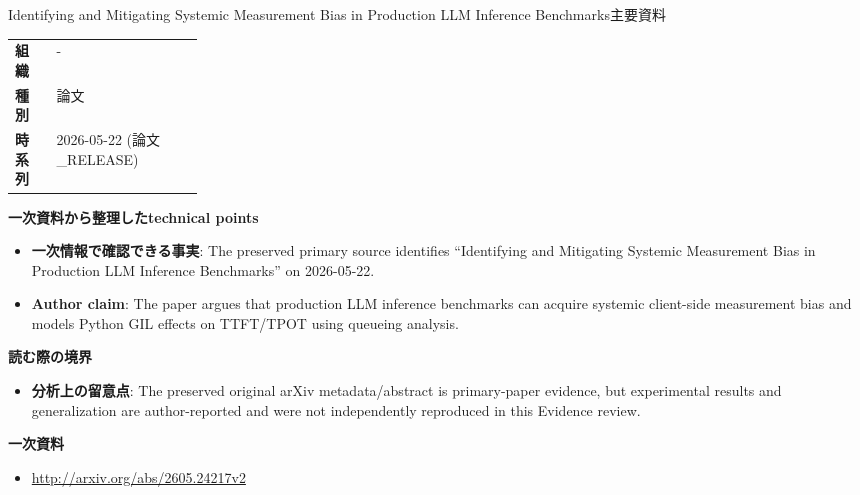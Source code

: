 \begin{technicalnote}{Identifying and Mitigating Systemic Measurement Bias in Production LLM Inference Benchmarks}{主要資料}
\begin{tabularx}{\linewidth}{@{}>{\bfseries}p{0.22\linewidth}X@{}}
組織 & - \\
種別 & 論文 \\
時系列 & 2026-05-22 (論文\_RELEASE) \\
\end{tabularx}
\smallskip
{\bfseries 一次資料から整理したtechnical points}
\begin{itemize}[leftmargin=1.5em,itemsep=0.35em]
\item \textbf{一次情報で確認できる事実}: The preserved primary source identifies “Identifying and Mitigating Systemic Measurement Bias in Production LLM Inference Benchmarks” on 2026-05-22.
\item \textbf{Author claim}: The paper argues that production LLM inference benchmarks can acquire systemic client-side measurement bias and models Python GIL effects on TTFT/TPOT using queueing analysis.
\end{itemize}
{\bfseries 読む際の境界}
\begin{itemize}[leftmargin=1.5em,itemsep=0.35em]
\item \textbf{分析上の留意点}: The preserved original arXiv metadata/abstract is primary-paper evidence, but experimental results and generalization are author-reported and were not independently reproduced in this Evidence review.
\end{itemize}
{\bfseries 一次資料}
\begingroup\sloppy
\begin{itemize}[leftmargin=1.5em,itemsep=0.25em]
\item {\scriptsize\url{http://arxiv.org/abs/2605.24217v2}}
\end{itemize}
\endgroup
\end{technicalnote}
\medskip

